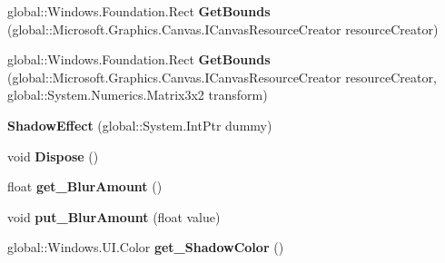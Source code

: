 \begin{DoxyCompactItemize}
\item 
\mbox{\label{class_microsoft_1_1_graphics_1_1_canvas_1_1_effects_1_1_shadow_effect_a74974b8df0482f01e4e4c8267d217afb}} 
global\+::\+Windows.\+Foundation.\+Rect {\bfseries Get\+Bounds} (global\+::\+Microsoft.\+Graphics.\+Canvas.\+I\+Canvas\+Resource\+Creator resource\+Creator)
\item 
\mbox{\label{class_microsoft_1_1_graphics_1_1_canvas_1_1_effects_1_1_shadow_effect_a9814bbd0429ff479d8ddd4998601c43d}} 
global\+::\+Windows.\+Foundation.\+Rect {\bfseries Get\+Bounds} (global\+::\+Microsoft.\+Graphics.\+Canvas.\+I\+Canvas\+Resource\+Creator resource\+Creator, global\+::\+System.\+Numerics.\+Matrix3x2 transform)
\item 
\mbox{\label{class_microsoft_1_1_graphics_1_1_canvas_1_1_effects_1_1_shadow_effect_a31ee829e7b76a3af6f36ea4b38c62c57}} 
{\bfseries Shadow\+Effect} (global\+::\+System.\+Int\+Ptr dummy)
\item 
\mbox{\label{class_microsoft_1_1_graphics_1_1_canvas_1_1_effects_1_1_shadow_effect_a73406e739d302a61cfd5aefe0433a499}} 
void {\bfseries Dispose} ()
\item 
\mbox{\label{class_microsoft_1_1_graphics_1_1_canvas_1_1_effects_1_1_shadow_effect_a68acc2d1a4491bb3ca7736b7a083a90c}} 
float {\bfseries get\+\_\+\+Blur\+Amount} ()
\item 
\mbox{\label{class_microsoft_1_1_graphics_1_1_canvas_1_1_effects_1_1_shadow_effect_a7a269550a65eebb6e9635d3b6bd9b2b1}} 
void {\bfseries put\+\_\+\+Blur\+Amount} (float value)
\item 
\mbox{\label{class_microsoft_1_1_graphics_1_1_canvas_1_1_effects_1_1_shadow_effect_a4398f180b368e7f56f3a362d05ba18d2}} 
global\+::\+Windows.\+U\+I.\+Color {\bfseries get\+\_\+\+Shadow\+Color} ()

\end{DoxyCompactItemize}

